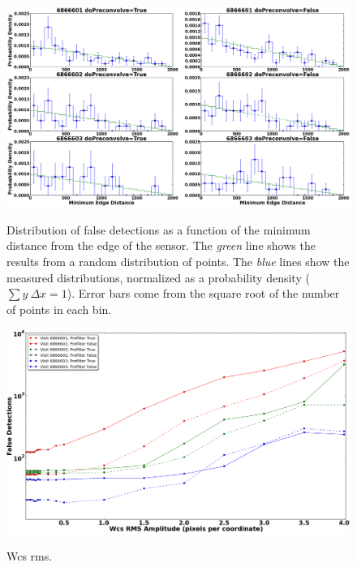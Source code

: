 \documentclass[prd, nofootinbib, floatfix, 11pt,tightenlines,times]{article}
\begin{document}
\begin{figure}
\includegraphics[width=1.0\textwidth]{figures/edge.eps} \\
\caption{Distribution of false detections as a function of the minimum
  distance from the edge of the sensor.  The {\it green} line shows
  the results from a random distribution of points.  The {\it blue}
  lines show the measured distributions, normalized as a probability
  density ($\sum y~\Delta x = 1$).  Error bars come from the square
  root of the number of points in each bin. }
\label{edgedist}
\end{figure}


\begin{figure}
\includegraphics[width=1.0\textwidth]{figures/wcs_rms.eps} \\
\caption{Wcs rms.}
\label{wcsrms}
\end{figure}
\end{document}
